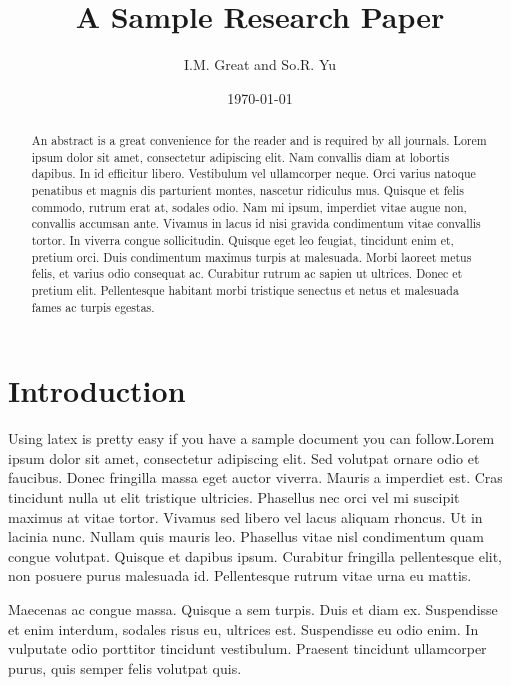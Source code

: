 \documentclass[aps,floatfix,prd,showpacs]{revtex4}
\begin{document}
\title{A Sample Research Paper}
\author{I.M. Great and So.R. Yu}

\date{\today}

\begin{abstract}
An abstract is a great convenience for the reader and is required by all journals. Lorem ipsum dolor sit amet, consectetur adipiscing elit. Nam convallis diam at lobortis dapibus. In id efficitur libero. Vestibulum vel ullamcorper neque. Orci varius natoque penatibus et magnis dis parturient montes, nascetur ridiculus mus. Quisque et felis commodo, rutrum erat at, sodales odio. Nam mi ipsum, imperdiet vitae augue non, convallis accumsan ante. Vivamus in lacus id nisi gravida condimentum vitae convallis tortor. In viverra congue sollicitudin. Quisque eget leo feugiat, tincidunt enim et, pretium orci. Duis condimentum maximus turpis at malesuada. Morbi laoreet metus felis, et varius odio consequat ac. Curabitur rutrum ac sapien ut ultrices. Donec et pretium elit. Pellentesque habitant morbi tristique senectus et netus et malesuada fames ac turpis egestas.
\end{abstract}
\maketitle

\section{Introduction}

Using latex is pretty easy if you have a sample document you can follow.Lorem ipsum dolor sit amet, consectetur adipiscing elit. Sed volutpat ornare odio et faucibus. Donec fringilla massa eget auctor viverra. Mauris a imperdiet est. Cras tincidunt nulla ut elit tristique ultricies. Phasellus nec orci vel mi suscipit maximus at vitae tortor. Vivamus sed libero vel lacus aliquam rhoncus. Ut in lacinia nunc. Nullam quis mauris leo. Phasellus vitae nisl condimentum quam congue volutpat. Quisque et dapibus ipsum. Curabitur fringilla pellentesque elit, non posuere purus malesuada id. Pellentesque rutrum vitae urna eu mattis.

Maecenas ac congue massa. Quisque a sem turpis. Duis et diam ex. Suspendisse et enim interdum, sodales risus eu, ultrices est. Suspendisse eu odio enim. In vulputate odio porttitor tincidunt vestibulum. Praesent tincidunt ullamcorper purus, quis semper felis volutpat quis.
\end{document}
